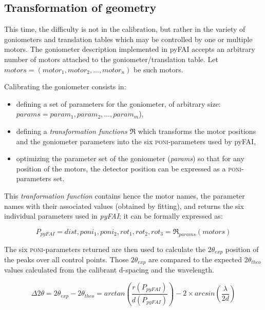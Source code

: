 \documentclass[preprint]{iucr}              %
\begin{document}
\subsection{Transformation of geometry}

This time, the difficulty is not in the calibration, but  rather in the
variety of goniometers and translation tables which may be controlled by one or multiple
motors.
The goniometer description implemented in pyFAI accepts an
arbitrary number of motors attached to the goniometer/translation table. 
Let $motors = (motor_1, motor_2, \ldots, motor_n)$ be such motors. 

Calibrating the goniometer consists in:
\begin{itemize}
  \item defining a set of parameters for the goniometer, of arbitrary size:
  $params = param_1, param_2, \ldots, param_m$),
  \item defining a \textit{transformation functions} $\Re$ which transforms the motor positions
  and the goniometer parameters into the six \textsc{poni}-parameters used by
  pyFAI,
  \item optimizing the parameter set of the goniometer (\textit{params}) so that
  for any position of the motors, the detector position can be expressed as
  a \textsc{poni}-parameters set.
\end{itemize}

This \textit{tranformation function} contains hence the motor names, the
parameter names with their associated values (obtained by fitting), and returns
the six individual parameters used in \textit{pyFAI}; it can be formally
expressed as:

\begin{equation}
P_{pyFAI} = dist, poni_1, poni_2, rot_1, rot_2, rot_3 = \Re_{params}(motors)
\end{equation}


The six \textsc{poni}-parameters returned 
are then used to
calculate the $2\theta_{exp}$ position of the peaks over all control
points.
Those $2\theta_{exp}$ are compared to
the expected $2\theta_{theo}$ values calculated from the calibrant d-spacing and
the wavelength.

$$
\Delta 2\theta = 2\theta _{exp} - 2\theta _{theo} =
arctan(\frac{r(P_{pyFAI})}{d(P_{pyFAI})}) -  2 \times
arcsin(\frac{\lambda}{2d})
$$
\end{document}
